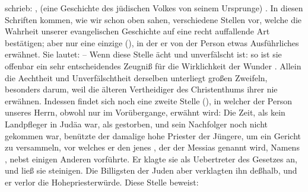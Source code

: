 \begin{aufza}
\begin{aufzb}
\item {} schrieb: ,  (eine Geschichte des jüdischen Volkes von seinem Ursprunge) . In diesen Schriften kommen, wie wir schon oben sahen, verschiedene Stellen vor, welche die Wahrheit unserer evangelischen Geschichte auf eine recht auffallende Art bestätigen; aber nur eine einzige (), in der er von der Person  etwas Ausführliches erwähnet. Sie lautet:  -- Wenn diese Stelle ächt und unverfälscht ist: so ist sie offenbar ein sehr entscheidendes Zeugniß für die Wirklichkeit der Wunder . Allein die Aechtheit und Unverfälschtheit derselben unterliegt großen Zweifeln, besonders darum, weil die älteren Vertheidiger des Christenthums ihrer nie erwähnen. Indessen findet sich noch eine zweite Stelle (), in welcher der Person unseres Herrn, obwohl nur im Vorübergange, erwähnt wird: Die Zeit, als kein Landpfleger in Judäa war, als  gestorben, und sein Nachfolger  noch nicht gekommen war, benützte der damalige hohe Priester  der Jüngere, um ein Gericht zu versammeln, vor welches er den  jenes , der der Messias genannt wird, Namens , nebst einigen Anderen vorführte. Er klagte sie als Uebertreter des Gesetzes an, und ließ sie steinigen. Die Billigsten der Juden aber verklagten ihn deßhalb, und er verlor die Hohepriesterwürde. Diese Stelle beweist:
\begin{aufzc}

\end{aufzc}
\end{aufzb}
\end{aufza}
